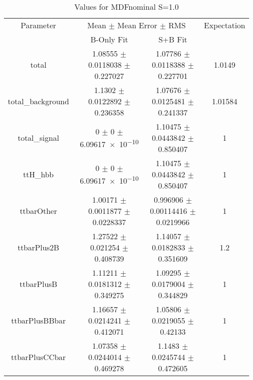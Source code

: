 \begin{table}
\centering
\caption{Values for MDFnominal S=1.0}
\begin{tabular}{cccc}
\toprule
Parameter & \multicolumn{2}{c}{Mean $\pm$ Mean Error $\pm$ RMS} & Expectation\\
 & B-Only Fit & S+B Fit & \\
\midrule
total & \num{1.08555} $\pm$ \num{0.0118038} $\pm$ \num{0.227027} & \num{1.07786} $\pm$ \num{0.0118388} $\pm$ \num{0.227701} & \num{1.0149}\\
total\_background & \num{1.1302} $\pm$ \num{0.0122892} $\pm$ \num{0.236358} & \num{1.07676} $\pm$ \num{0.0125481} $\pm$ \num{0.241337} & \num{1.01584}\\
total\_signal & \num{0} $\pm$ \num{0} $\pm$ \num{6.09617e-10} & \num{1.10475} $\pm$ \num{0.0443842} $\pm$ \num{0.850407} & \num{1}\\
ttH\_hbb & \num{0} $\pm$ \num{0} $\pm$ \num{6.09617e-10} & \num{1.10475} $\pm$ \num{0.0443842} $\pm$ \num{0.850407} & \num{1}\\
ttbarOther & \num{1.00171} $\pm$ \num{0.0011877} $\pm$ \num{0.0228337} & \num{0.996906} $\pm$ \num{0.00114416} $\pm$ \num{0.0219966} & \num{1}\\
ttbarPlus2B & \num{1.27522} $\pm$ \num{0.021254} $\pm$ \num{0.408739} & \num{1.14057} $\pm$ \num{0.0182833} $\pm$ \num{0.351609} & \num{1.2}\\
ttbarPlusB & \num{1.11211} $\pm$ \num{0.0181312} $\pm$ \num{0.349275} & \num{1.09295} $\pm$ \num{0.0179004} $\pm$ \num{0.344829} & \num{1}\\
ttbarPlusBBbar & \num{1.16657} $\pm$ \num{0.0214241} $\pm$ \num{0.412071} & \num{1.05806} $\pm$ \num{0.0219055} $\pm$ \num{0.42133} & \num{1}\\
ttbarPlusCCbar & \num{1.07358} $\pm$ \num{0.0244014} $\pm$ \num{0.469278} & \num{1.1483} $\pm$ \num{0.0245744} $\pm$ \num{0.472605} & \num{1}\\
\bottomrule
\end{tabular}
\end{table}